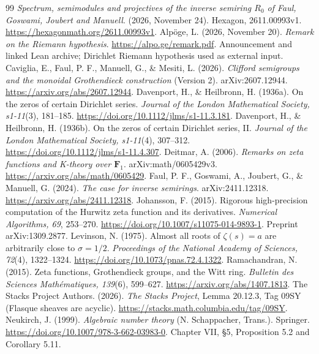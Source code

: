 \documentclass[11pt]{article}
\theoremstyle{definition}\newtheorem{definition}[theorem]{Definition}
\begin{document}
\begin{thebibliography}{99}
\emph{Spectrum, semimodules and projectives of the inverse semiring $R_0$ of Faul, Goswami, Joubert and Manuell}. (2026, November 24).
Hexagon, 2611.00993v1. \url{https://hexagonmath.org/2611.00993v1}.
 Alp\"oge, L. (2026, November 20). \emph{Remark on the Riemann hypothesis}. \url{https://alpo.ge/remark.pdf}. Announcement and linked Lean archive; Dirichlet Riemann hypothesis used as external input.
 Caviglia, E., Faul, P. F., Manuell, G., \& Mesiti, L. (2026). \emph{Clifford semigroups and the monoidal Grothendieck construction} (Version 2). arXiv:2607.12944. \url{https://arxiv.org/abs/2607.12944}.
 Davenport, H., \& Heilbronn, H. (1936a). On the zeros of certain Dirichlet series. \emph{Journal of the London Mathematical Society, s1-11}(3), 181--185. \url{https://doi.org/10.1112/jlms/s1-11.3.181}.
 Davenport, H., \& Heilbronn, H. (1936b). On the zeros of certain Dirichlet series, II. \emph{Journal of the London Mathematical Society, s1-11}(4), 307--312. \url{https://doi.org/10.1112/jlms/s1-11.4.307}.
 Deitmar, A. (2006). \emph{Remarks on zeta functions and K-theory over $\mathbf F_1$}. arXiv:math/0605429v3. \url{https://arxiv.org/abs/math/0605429}.
 Faul, P. F., Goswami, A., Joubert, G., \& Manuell, G. (2024). \emph{The case for inverse semirings}. arXiv:2411.12318. \url{https://arxiv.org/abs/2411.12318}.
 Johansson, F. (2015). Rigorous high-precision computation of the Hurwitz zeta function and its derivatives. \emph{Numerical Algorithms, 69}, 253--270. \url{https://doi.org/10.1007/s11075-014-9893-1}. Preprint arXiv:1309.2877.
 Levinson, N. (1975). Almost all roots of $\zeta(s)=a$ are arbitrarily close to $\sigma=1/2$. \emph{Proceedings of the National Academy of Sciences, 72}(4), 1322--1324. \url{https://doi.org/10.1073/pnas.72.4.1322}.
 Ramachandran, N. (2015). Zeta functions, Grothendieck groups, and the Witt ring. \emph{Bulletin des Sciences Math\'ematiques, 139}(6), 599--627. \url{https://arxiv.org/abs/1407.1813}.
The Stacks Project Authors. (2026). \emph{The Stacks Project}, Lemma 20.12.3, Tag 09SY (Flasque sheaves are acyclic). \url{https://stacks.math.columbia.edu/tag/09SY}.
Neukirch, J. (1999). \emph{Algebraic number theory} (N. Schappacher, Trans.).
Springer. \url{https://doi.org/10.1007/978-3-662-03983-0}.
Chapter VII, \S5, Proposition 5.2 and Corollary 5.11.


\end{thebibliography}
\end{document}

